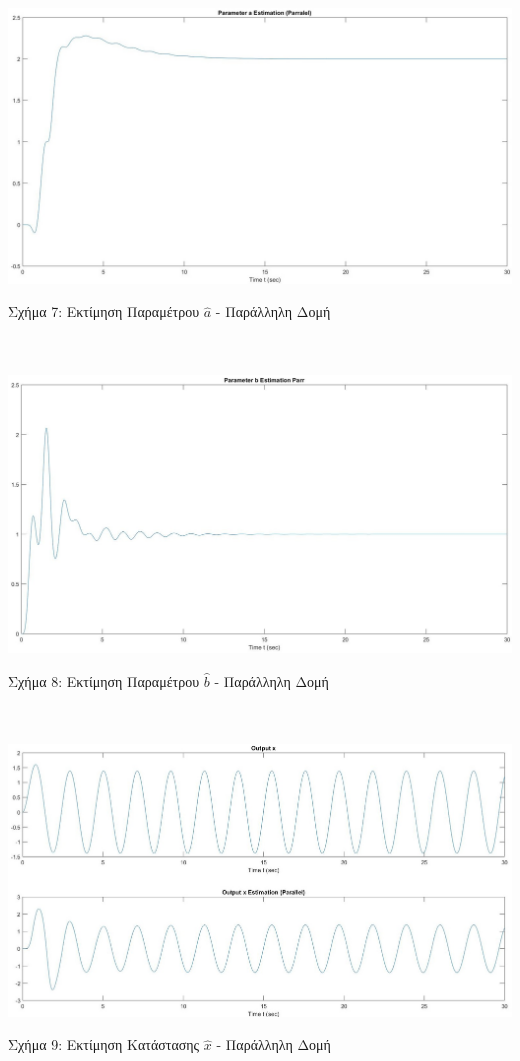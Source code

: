 \documentclass[12pt]{article}
\begin{document}
\includegraphics[width=\linewidth]{a_estim_par_2.jpg}
\centerline{Σχήμα 7: Εκτίμηση Παραμέτρου $\hat{a}$ - Παράλληλη Δομή}
\\ \\
\includegraphics[width=\linewidth]{b_estim_par_2.jpg}
\centerline{Σχήμα 8: Εκτίμηση Παραμέτρου $\hat{b}$ - Παράλληλη Δομή}
\\ \\
\includegraphics[width=\linewidth]{x_estim_par_2.jpg}
\centerline{Σχήμα 9: Εκτίμηση Κατάστασης $\hat{x}$ - Παράλληλη Δομή}
\end{document}
